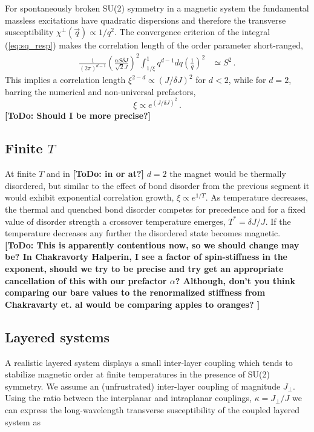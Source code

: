 \documentclass[twocolumn,english,aps,prl,floatfix]{revtex4-1}
\newcommand{\todo}[1]{{\color{red} {\bf [ToDo: #1]}}}
\begin{document}
For spontaneously broken SU(2) symmetry in a magnetic system 
the fundamental massless excitations have quadratic dispersions and 
therefore the transverse susceptibility 
$\chi^\perp(\vec{q})\propto 1/q^2$. The convergence criterion of the 
integral (\ref{eq:sq_resp}) makes the correlation length of 
the order parameter short-ranged,
\begin{equation}
    \begin{aligned}
        \frac{1}{(2\pi)^{d-1}}
        \left(\frac{\alpha S\delta J}{\sqrt{2} J}\right)^2
        \int_{1/\xi}^1q^{d-1}dq
        \left(\frac{1}{q}\right)^2
        & \simeq S^2 \,.
    \end{aligned}
\end{equation}
This implies a correlation length $\xi^{2-d} \propto (J/\delta J)^2$ 
for $d<2$, while for $d=2$, barring the numerical and non-universal 
prefactors,
\begin{equation}
    \xi \propto e^{(J/\delta J)^2}\,.
    \label{xi}
\end{equation}
\todo{Should I be more precise?}

\subsection{Finite $T$}

At finite $T$ and in \todo{in or at?} $d=2$ the magnet would be 
thermally disordered, but similar to the effect of bond disorder 
from the previous segment it would exhibit exponential correlation growth, 
$\xi \propto e^{1/T} $\cite{chakravarty87}. As temperature decreases,
the thermal and quenched bond disorder competes for precedence and for
a fixed value of disorder strength a crossover temperature
emerges, $ T^* = \delta J/J$. If the temperature decreases any further
the disordered state becomes magnetic. \todo {This is apparently
contentious now, so we should change may be? In Chakravorty Halperin, I 
see a factor of spin-stiffness in the exponent, should we try to be
precise and try get an appropriate cancellation of this with our
prefactor $\alpha$? Although, don't you think comparing our bare
values to the renormalized stiffness from Chakravarty et. al 
would be comparing apples to oranges?
}

\subsection{Layered systems}

A realistic layered system displays a small inter-layer coupling 
which tends to stabilize magnetic order at finite temperatures 
in the presence of SU(2) symmetry. We assume an (unfrustrated) 
inter-layer coupling of magnitude $J_\perp$. Using the ratio 
between the interplanar and intraplanar couplings,
$\kappa=J_\perp/J$ we can express the long-wavelength transverse 
susceptibility of the coupled layered system as
\end{document}
